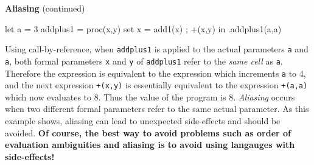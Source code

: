 \begin{minipage}[t]{\sw}
\slidenumber
\LARGE
{\bf Aliasing} (continued)
\begin{qv}
let
  a = 3
  addplus1 = proc(x,y) {set x = add1(x) ; +(x,y)}
in
  .addplus1(a,a)
\end{qv}
Using call-by-reference,
when \verb'addplus1' is applied
to the actual parameters \verb'a' and \verb'a',
both formal parameters \verb'x' and \verb'y' of \verb'addplus1'
refer to the {\em same cell} as \verb'a'.
Therefore the  expression
is equivalent to the expression
which increments \verb'a' to 4,
and the next expression \verb'+(x,y)' is essentially equivalent
to the expression \verb'+(a,a)' which now evaluates to 8.
Thus the value of the program is 8.\exx
{\em Aliasing} occurs when two different formal parameters
refer to the same actual parameter.
As this example shows, aliasing can lead
to unexpected side-effects and should be avoided.
{\bf Of course, the best way to avoid problems such as
order of evaluation ambiguities and aliasing
is to avoid using langauges with side-effects!}
\end{minipage}
\clearpage
